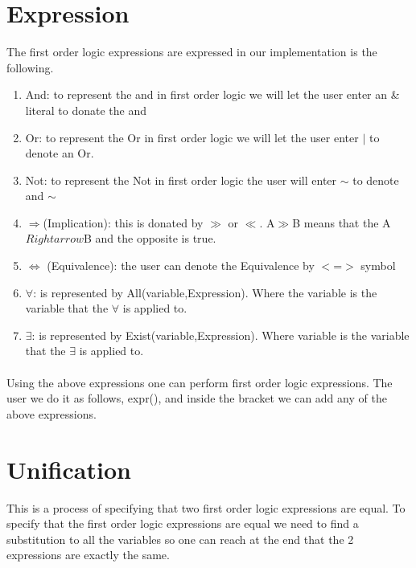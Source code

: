 \label{chap:assign1}{
\section{Expression}
The first order logic expressions are expressed in our implementation is the following.
\begin{enumerate}
\item{And: to represent the and in first order logic we will let the user enter an \& literal to donate the and}
\item{Or: to represent the Or in first order logic we will let the user enter $\mid$ to denote an Or.}
\item{Not: to represent the Not in first order logic the user will enter $\sim$ to denote and $\sim$}
\item{$\Rightarrow$(Implication): this is donated by $\gg$ or $\ll$. A$\gg$B means that the A $Rightarrow$B and the opposite is true.}
\item{$\Leftrightarrow$ (Equivalence): the user can denote the Equivalence by $<$=$>$ symbol}
\item{$\forall$: is represented by All(variable,Expression). Where the variable is the variable that the $\forall$ is applied to.}
\item{$\exists$: is represented by Exist(variable,Expression). Where variable is the variable that the $\exists$ is applied to.}
\end{enumerate}
\paragraph*{}
Using the above expressions one can perform first order logic expressions. The user we do it as follows, expr(), and inside the bracket we can add any of the above expressions.
\section{Unification}
This is a process of specifying that two first order logic expressions are
equal. To specify that the first order logic expressions are equal we need to find a substitution to all the variables so one can reach at the end that the 2 expressions are exactly the same.
}
